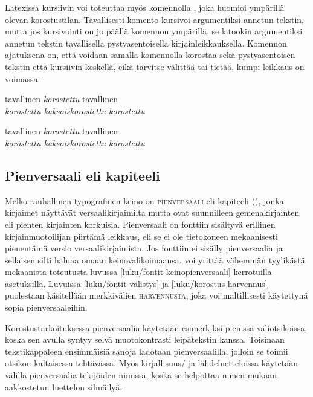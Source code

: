 Latexissa kursiivin voi toteuttaa myös komennolla , joka
huomioi ympärillä olevan korostustilan. Tavallisesti komento kursivoi
argumentiksi annetun tekstin, mutta jos kursivointi on jo päällä
komennon ympärillä, se latookin argumentiksi annetun tekstin
tavallisella pystyasentoisella kirjainleikkauksella. Komennon ajatuksena
on, että voidaan samalla komennolla korostaa sekä pystyasentoisen
tekstin että kursiivin keskellä, eikä tarvitse välittää tai tietää,
kumpi leikkaus on voimassa.

\begin{koodilohkosis}
tavallinen \emph{korostettu} tavallinen \\
\emph{korostettu \emph{kaksoiskorostettu} korostettu}
\end{koodilohkosis}

\begin{tulossis}
  tavallinen \emph{korostettu} tavallinen \\
  \emph{korostettu \emph{kaksoiskorostettu} korostettu}
\end{tulossis}

\subsection{Pienversaali eli kapiteeli}
\label{luku/korostus-pienversaali}

Melko rauhallinen typografinen keino on \textsc{pienversaali} eli
kapiteeli (), jonka kirjaimet näyttävät
versaalikirjaimilta mutta ovat suunnilleen gemenakirjainten eli pienten
kirjainten korkuisia. Pienversaali on fonttiin sisältyvä erillinen
kirjainmuotoilijan piirtämä leikkaus, eli se ei ole tietokoneen
mekaanisesti pienentämä versio versaalikirjaimista. Jos fonttiin ei
sisälly pienversaalia ja sellaisen silti haluaa omaan
keinovalikoimaansa, voi yrittää vähemmän tyylikästä mekaanista
toteutusta luvussa \ref{luku/fontit-keinopienversaali} kerrotuilla
asetuksilla. Luvuissa \ref{luku/fontit-välistys} ja
\ref{luku/korostus-harvennus} puolestaan käsitellään merkkivälien
{\scshape{} harvennusta}, joka voi
maltillisesti käytettynä sopia pienversaaleihin.

Korostustarkoituksessa pienversaalia käytetään esimerkiksi pienissä
väliotsikoissa, koska sen avulla syntyy selvä muotokontrasti
leipätekstin kanssa. Toisinaan tekstikappaleen ensimmäisiä sanoja
ladotaan pienversaalilla, jolloin se toimii otsikon kaltaisessa
tehtävässä. Myös kirjallisuus\-/{} ja lähdeluetteloissa käytetään
välillä pienversaalia tekijöiden nimissä, koska se helpottaa nimen
mukaan aakkostetun luettelon silmäilyä.

